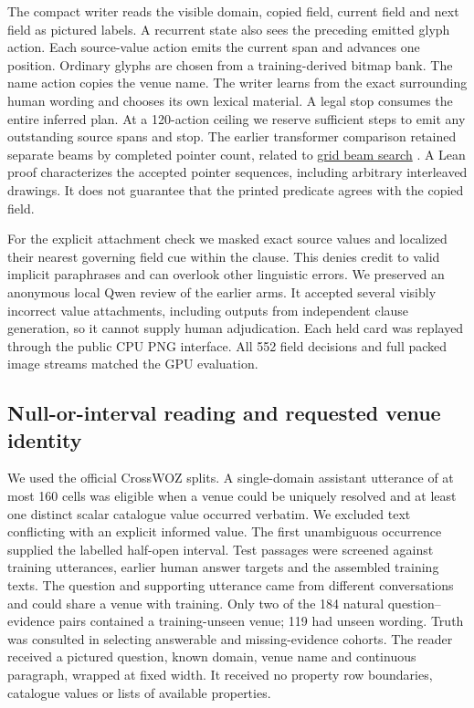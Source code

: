 \documentclass[12pt,a4paper]{article}
\providecommand{\DIFadd}[1]{{\protect\color{blue} \sf #1}} %
\begin{document}
\DIFadd{The compact writer reads the visible domain, copied field, current field and next field as pictured labels. A recurrent state also sees the preceding emitted glyph action. Each source-value action emits the current span and advances one position. Ordinary glyphs are chosen from a training-derived bitmap bank. The name action copies the venue name. The writer learns from the exact surrounding human wording and chooses its own lexical material. A legal stop consumes the entire inferred plan. At a 120-action ceiling we reserve sufficient steps to emit any outstanding source spans and stop. The earlier transformer comparison retained separate beams by completed pointer count, related to }\href{https://aclanthology.org/P17-1141/}{\DIFadd{grid beam search}}\DIFadd{. A Lean proof characterizes the accepted pointer sequences, including arbitrary interleaved drawings. It does not guarantee that the printed predicate agrees with the copied field.
}

\DIFadd{For the explicit attachment check we masked exact source values and localized their nearest governing field cue within the clause. This denies credit to valid implicit paraphrases and can overlook other linguistic errors. We preserved an anonymous local Qwen review of the earlier arms. It accepted several visibly incorrect value attachments, including outputs from independent clause generation, so it cannot supply human adjudication. Each held card was replayed through the public CPU PNG interface. All 552 field decisions and full packed image streams matched the GPU evaluation.
}

\subsection*{\DIFadd{Null-or-interval reading and requested venue identity}}
\DIFadd{We used the official CrossWOZ splits. A single-domain assistant utterance of at most 160 cells was eligible when a venue could be uniquely resolved and at least one distinct scalar catalogue value occurred verbatim. We excluded text conflicting with an explicit informed value. The first unambiguous occurrence supplied the labelled half-open interval. Test passages were screened against training utterances, earlier human answer targets and the assembled training texts. The question and supporting utterance came from different conversations and could share a venue with training. Only two of the 184 natural question--evidence pairs contained a training-unseen venue; 119 had unseen wording. Truth was consulted in selecting answerable and missing-evidence cohorts. The reader received a pictured question, known domain, venue name and continuous paragraph, wrapped at fixed width. It received no property row boundaries, catalogue values or lists of available properties.
}
\end{document}

